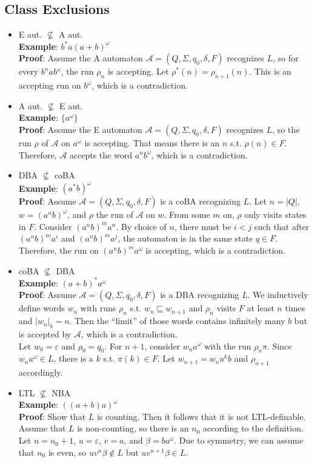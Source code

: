 \documentclass{article}
\begin{document}
\subsection{Class Exclusions}
\begin{itemize}
	\item E aut. $\not\subseteq$ A aut. \\
		\textbf{Example}: $b^* a (a+b)^\omega$ \\
    	\textbf{Proof}: Assume the A automaton $\mathcal{A} = (Q, \Sigma, q_0, \delta, F)$ recognizes $L$, so for every $b^n a b^\omega$, the run $\rho_n$ is accepting. Let $\rho^*(n) = \rho_{n+1}(n)$. This is an accepting run on $b^\omega$, which is a contradiction.
	\item A aut. $\not\subseteq$ E aut. \\
		\textbf{Example}: $\{a^\omega\}$ \\
    	\textbf{Proof}: Assume the E automaton $\mathcal{A} = (Q, \Sigma, q_0, \delta, F)$ recognizes $L$, so the run $\rho$ of $\mathcal{A}$ on $a^\omega$ is accepting. That means there is an $n$ s.t. $\rho(n) \in F$. Therefore, $\mathcal{A}$ accepts the word $a^n b^\omega$, which is a contradiction.
	\item DBA $\not\subseteq$ coBA \\
		\textbf{Example}: $(a^*b)^\omega$ \\
    	\textbf{Proof}: Assume $\mathcal{A} = (Q, \Sigma, q_0, \delta, F)$ is a coBA recognizing $L$. Let $n = |Q|$, $w = (a^n b)^\omega$, and $\rho$ the run of $\mathcal{A}$ on $w$. From some $m$ on, $\rho$ only visits states in $F$. Consider $(a^n b)^m a^n$. By choice of $n$, there must be $i < j$ such that after $(a^n b)^m a^i$ and $(a^n b)^m a^j$, the automaton is in the same state $q \in F$. Therefore, the run on $(a^n b)^m a^\omega$ is accepting, which is a contradiction.
	\item coBA $\not\subseteq$ DBA \\
		\textbf{Example}: $(a+b)^* a^\omega$ \\
    	\textbf{Proof}: Assume $\mathcal{A} = (Q, \Sigma, q_0, \delta, F)$ is a DBA recognizing $L$. We inductively define words $w_n$ with runs $\rho_n$ s.t. $w_n \sqsubseteq w_{n+1}$ and $\rho_n$ visits $F$ at least $n$ times and $|w_n|_b = n$. Then the ``limit'' of those words contains infinitely many $b$ but is accepted by $\mathcal{A}$, which is a contradiction. \\
    	Let $w_0 = \varepsilon$ and $\rho_0 = q_0$. For $n+1$, consider $w_n a^\omega$ with the run $\rho_n \pi$. Since $w_n a^\omega \in L$, there is a $k$ s.t. $\pi(k) \in F$. Let $w_{n+1} = w_n a^k b$ and $\rho_{n+1}$ accordingly.
	\item LTL $\not\subseteq$ NBA \\
		\textbf{Example}: $((a+b) a)^\omega$ \\
    	\textbf{Proof}: Show that $L$ is counting. Then it follows that it is not LTL-definable. Assume that $L$ is non-counting, so there is an $n_0$ according to the definition. Let $n = n_0 + 1$, $u = \varepsilon$, $v = a$, and $\beta = b a^\omega$. Due to symmetry, we can assume that $n_0$ is even, so $u v^n \beta \notin L$ but $u v^{n+1} \beta \in L$.
\end{itemize}
\end{document}
